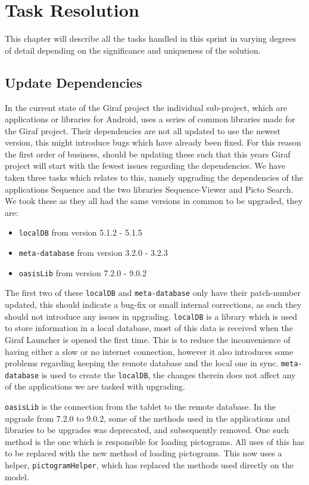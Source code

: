 \chapter{Task Resolution}
This chapter will describe all the tasks handled in this sprint in varying degrees of detail depending on the significance and uniqueness of the solution.

\section{Update Dependencies}
In the current state of the Giraf project the individual sub-project, which are applications or libraries for Android, uses a series of common libraries made for the Giraf project.
Their dependencies are not all updated to use the newest version, this might introduce bugs which have already been fixed.
For this reason the first order of business, should be updating these such that this years Giraf project will start with the fewest issues regarding the dependencies. 
We have taken three tasks which relates to this, namely upgrading the dependencies of the applications Sequence and the two libraries Sequence-Viewer and Picto Search.
We took these as they all had the same versions in common to be upgraded, they are:
\begin{itemize}
    \item \texttt{localDB} from version 5.1.2 - 5.1.5
    \item \texttt{meta-database} from version 3.2.0 - 3.2.3
    \item \texttt{oasisLib} from version 7.2.0 - 9.0.2
\end{itemize}
The first two of these \texttt{localDB} and \texttt{meta-database} only have their patch-number updated, this should indicate a bug-fix or small internal corrections, as such they should not introduce any issues in upgrading. 
\texttt{localDB} is a library which is used to store information in a local database, most of this data is received when the Giraf Launcher is opened the first time. 
This is to reduce the inconvenience of having either a slow or no internet connection, however it also introduces some problems regarding keeping the remote database and the local one in sync. 
\texttt{meta-database} is used to create the \texttt{localDB}, the changes therein does not affect any of the applications we are tasked with upgrading. 

\texttt{oasisLib} is the connection from the tablet to the remote database.
In the upgrade from 7.2.0 to 9.0.2, some of the methods used in the applications and libraries to be upgrades was deprecated, and subsequently removed. 
One such method is the one which is responsible for loading pictograms.
All uses of this has to be replaced with the new method of loading pictograms. 
This now uses a helper, \texttt{pictogramHelper}, which has replaced the methods used directly on the model. 

